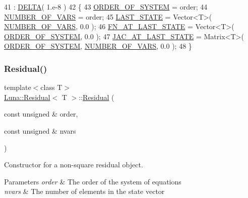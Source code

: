 \begin{DoxyCode}
41                                         : \hyperlink{classLuna_1_1Residual_a1bf38ddfa149797de560dcb11c975fef}{DELTA}( 1.e-8 )
42       \{
43         \hyperlink{classLuna_1_1Residual_a7facf1267eb277d84aeea8beba2cb200}{ORDER\_OF\_SYSTEM} = order;
44         \hyperlink{classLuna_1_1Residual_a8e7a52a94a49d900ba2784e621a35668}{NUMBER\_OF\_VARS} = order;
45         \hyperlink{classLuna_1_1Residual_abcfc99f00aa4cf3616b32dfd5315dece}{LAST\_STATE} = Vector<T>( \hyperlink{classLuna_1_1Residual_a8e7a52a94a49d900ba2784e621a35668}{NUMBER\_OF\_VARS}, 0.0 );
46         \hyperlink{classLuna_1_1Residual_ac7b086911239d3f42ceec4a826e83543}{FN\_AT\_LAST\_STATE} = Vector<T>( \hyperlink{classLuna_1_1Residual_a7facf1267eb277d84aeea8beba2cb200}{ORDER\_OF\_SYSTEM}, 0.0 );
47         \hyperlink{classLuna_1_1Residual_ac76c460240288f84309b587c785df06a}{JAC\_AT\_LAST\_STATE} = Matrix<T>( \hyperlink{classLuna_1_1Residual_a7facf1267eb277d84aeea8beba2cb200}{ORDER\_OF\_SYSTEM}, 
      \hyperlink{classLuna_1_1Residual_a8e7a52a94a49d900ba2784e621a35668}{NUMBER\_OF\_VARS}, 0.0 );
48       \}
\end{DoxyCode}
\mbox{\label{classLuna_1_1Residual_a7c109fba68ee9658d4e2a81929c4c2cd}} 
\subsubsection{\texorpdfstring{Residual()}{Residual()}\hspace{0.1cm}{\footnotesize\ttfamily [2/2]}}
{\footnotesize\ttfamily template$<$class T$>$ \\
\hyperlink{classLuna_1_1Residual}{Luna\+::\+Residual}$<$ T $>$\+::\hyperlink{classLuna_1_1Residual}{Residual} (\begin{DoxyParamCaption}\item[{const unsigned \&}]{order,  }\item[{const unsigned \&}]{nvars }\end{DoxyParamCaption})\hspace{0.3cm}{\ttfamily [inline]}}



Constructor for a \textquotesingle{}non-\/square\textquotesingle{} residual object. 


\begin{DoxyParams}{Parameters}
{\em order} & The order of the system of equations \\
\hline
{\em nvars} & The number of elements in the state vector \\
\hline
\end{DoxyParams}


